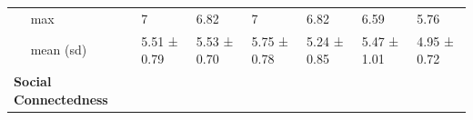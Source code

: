 \documentclass[
  english,
  man,floatsintext]{apa6}
\begin{document}
\begin{longtable}[]{@{}lllllll@{}}
\begin{minipage}[t]{0.16\columnwidth}\raggedright
~~ max\strut
\end{minipage} & \begin{minipage}[t]{0.11\columnwidth}\raggedright
7\strut
\end{minipage} & \begin{minipage}[t]{0.11\columnwidth}\raggedright
6.82\strut
\end{minipage} & \begin{minipage}[t]{0.11\columnwidth}\raggedright
7\strut
\end{minipage} & \begin{minipage}[t]{0.11\columnwidth}\raggedright
6.82\strut
\end{minipage} & \begin{minipage}[t]{0.11\columnwidth}\raggedright
6.59\strut
\end{minipage} & \begin{minipage}[t]{0.11\columnwidth}\raggedright
5.76\strut
\end{minipage}\tabularnewline
\begin{minipage}[t]{0.16\columnwidth}\raggedright
~~ mean (sd)\strut
\end{minipage} & \begin{minipage}[t]{0.11\columnwidth}\raggedright
5.51 ± 0.79\strut
\end{minipage} & \begin{minipage}[t]{0.11\columnwidth}\raggedright
5.53 ± 0.70\strut
\end{minipage} & \begin{minipage}[t]{0.11\columnwidth}\raggedright
5.75 ± 0.78\strut
\end{minipage} & \begin{minipage}[t]{0.11\columnwidth}\raggedright
5.24 ± 0.85\strut
\end{minipage} & \begin{minipage}[t]{0.11\columnwidth}\raggedright
5.47 ± 1.01\strut
\end{minipage} & \begin{minipage}[t]{0.11\columnwidth}\raggedright
4.95 ± 0.72\strut
\end{minipage}\tabularnewline
\begin{minipage}[t]{0.16\columnwidth}\raggedright
\textbf{Social Connectedness}\strut
\end{minipage} & \begin{minipage}[t]{0.11\columnwidth}\raggedright
~~\strut
\end{minipage} & \begin{minipage}[t]{0.11\columnwidth}\raggedright

\end{minipage}
\end{longtable}
\end{document}
